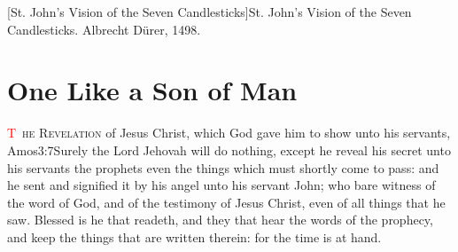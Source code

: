 [St. John's Vision of the Seven Candlesticks]{St. John's Vision of the Seven Candlesticks. Albrecht Dürer, 1498.}

\pagestyle{fancy}
\mainmatter
\trimFrame
\chapter{One Like a Son of Man}
\begingroup
\let\clearpage\relax
\endgroup
\lettrine[lines=3,nindent=-0.3em,loversize=0.05]{\textcolor{red}{T}}{\ he Revelation} of Jesus Christ, which God gave him to show unto his servants,%
			{Amos}{3:7}{Surely the Lord Jehovah will do nothing, except he reveal his secret unto his servants the prophets}
 even the things which must shortly come to pass: and he sent and signified it by his angel unto his servant John; %
who bare witness of the word of God, and of the testimony of Jesus Christ, even of all things that he saw. %
Blessed is he that readeth, and they that hear the words of the prophecy, and keep the things that are written therein: for the time is at hand.
